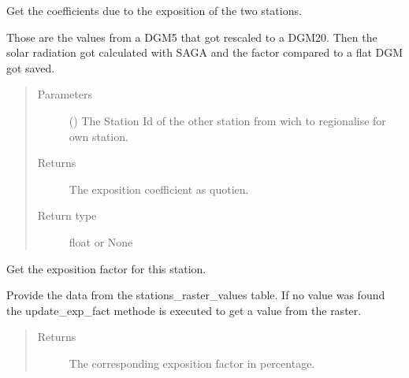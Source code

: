 \documentclass[letterpaper,10pt,english]{sphinxmanual}
\begin{document}
\begin{fulllineitems}

\begin{fulllineitems}
\label{\detokenize{weatherDB:weatherDB.station.StationTETBase.get_coef_exp}}
\sphinxAtStartPar
Get the coefficients due to the exposition of the two stations.

\sphinxAtStartPar
Those are the values from a DGM5 that got rescaled to a DGM20.
Then the solar radiation got calculated with SAGA and the factor compared to a flat DGM got saved.
\begin{quote}\begin{description}
\item[{Parameters}] \leavevmode
\sphinxAtStartPar
{} () \textendash{} The Station Id of the other station from wich to regionalise for own station.

\item[{Returns}] \leavevmode
\sphinxAtStartPar
The exposition coefficient as quotien.

\item[{Return type}] \leavevmode
\sphinxAtStartPar
float or None

\end{description}\end{quote}

\end{fulllineitems}


\begin{fulllineitems}
\label{\detokenize{weatherDB:weatherDB.station.StationTETBase.get_exp_fact}}
\sphinxAtStartPar
Get the exposition factor for this station.

\sphinxAtStartPar
Provide the data from the stations\_raster\_values table.
If no value was found the update\_exp\_fact methode is executed to get a value from the raster.
\begin{quote}\begin{description}
\item[{Returns}] \leavevmode
\sphinxAtStartPar
The corresponding exposition factor in percentage.


\end{description}
\end{quote}
\end{fulllineitems}
\end{fulllineitems}
\end{document}
